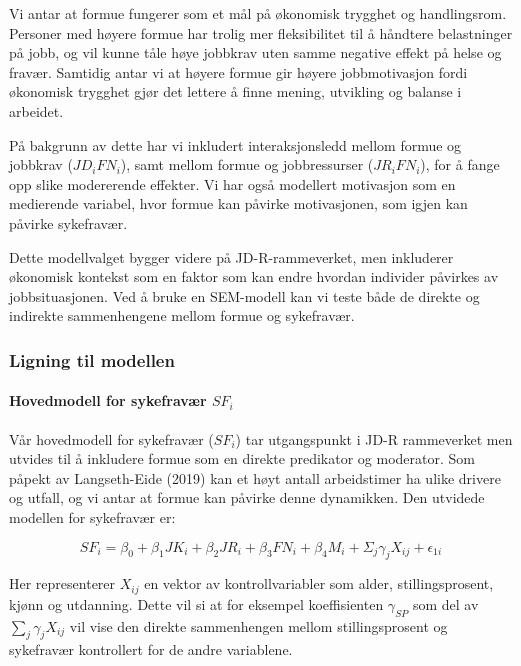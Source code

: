 \documentclass[
  12pt,
  a4paper,
  DIV=11,
  numbers=noendperiod]{scrartcl}
\let\oldparagraph\paragraph
\renewcommand{\paragraph}[1]{\oldparagraph{#1}\mbox{}}
\begin{document}
Vi antar at formue fungerer som et mål på økonomisk trygghet og
handlingsrom. Personer med høyere formue har trolig mer fleksibilitet
til å håndtere belastninger på jobb, og vil kunne tåle høye jobbkrav
uten samme negative effekt på helse og fravær. Samtidig antar vi at
høyere formue gir høyere jobbmotivasjon fordi økonomisk trygghet gjør
det lettere å finne mening, utvikling og balanse i arbeidet.

På bakgrunn av dette har vi inkludert interaksjonsledd mellom formue og
jobbkrav (\(JD_i FN_i\)), samt mellom formue og jobbressurser
(\(JR_i FN_i\)), for å fange opp slike modererende effekter. Vi har også
modellert motivasjon som en medierende variabel, hvor formue kan påvirke
motivasjonen, som igjen kan påvirke sykefravær.

Dette modellvalget bygger videre på JD-R-rammeverket, men inkluderer
økonomisk kontekst som en faktor som kan endre hvordan individer
påvirkes av jobbsituasjonen. Ved å bruke en SEM-modell kan vi teste både
de direkte og indirekte sammenhengene mellom formue og sykefravær.

\subsubsection{Ligning til modellen}\label{ligning-til-modellen}

\paragraph{\texorpdfstring{Hovedmodell for sykefravær
\(SF_i\)}{Hovedmodell for sykefravær SF\_i}}\label{hovedmodell-for-sykefravuxe6r-sf_i}

Vår hovedmodell for sykefravær (\(SF_i\)) tar utgangspunkt i JD-R
rammeverket men utvides til å inkludere formue som en direkte predikator
og moderator. Som påpekt av Langseth-Eide (2019) kan et høyt antall
arbeidstimer ha ulike drivere og utfall, og vi antar at formue kan
påvirke denne dynamikken. Den utvidede modellen for sykefravær er:

\[
SF_i = \beta_0 + \beta_1 JK_i + \beta_2 JR_i + \beta_3 FN_i
        + \beta_4 M_i + \Sigma_j \gamma_{j}X_{ij} + \epsilon_{1i} \label{eq:sf_utvidet}
\]

Her representerer \(X_{ij}\) en vektor av kontrollvariabler som alder,
stillingsprosent, kjønn og utdanning. Dette vil si at for eksempel
koeffisienten \(\gamma_{SP}\) som del av \(\sum_j \gamma_{j}X_{ij}\) vil
vise den direkte sammenhengen mellom stillingsprosent og sykefravær
kontrollert for de andre variablene.
\end{document}
